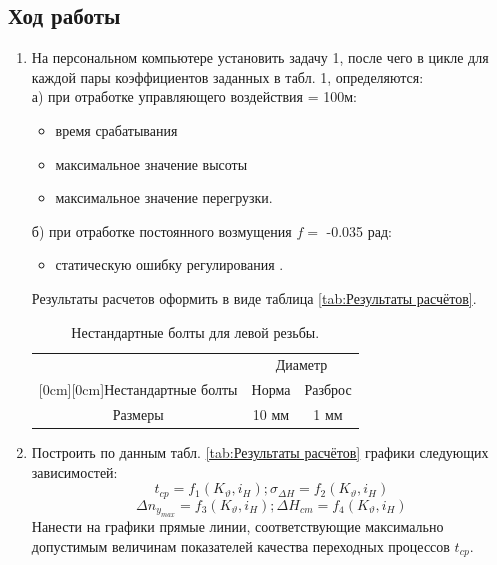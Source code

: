 \documentclass[a4paper,12pt]{article}
\begin{document}
    \subsection{Ход работы}
    
    \begin{enumerate}
    \item На персональном компьютере установить задачу 1, после чего в цикле для
    каждой   пары   коэффициентов  заданных   в  табл.   1,
    определяются:\\
    а)	при отработке управляющего воздействия  = 100м:
        \begin{itemize}
            \item время срабатывания   
            \item максимальное значение высоты  
            \item максимальное значение перегрузки.
        \end{itemize}
    б)	при отработке постоянного возмущения $f=$ -0.035 рад:
        \begin{itemize}
            \item статическую ошибку регулирования .
        \end{itemize}
    
    Результаты расчетов оформить в виде таблица \ref{tab:Результаты расчётов}.

    \begin{table}[H]
        \caption{\label{tab:bolts} Нестандартные болты для левой резьбы.}
            \begin{center}
                \begin{tabular}{|c|c|c|}
                \hline
                & \multicolumn{2}{c|}{Диаметр} \\
                \cline{2-3}
                \raisebox{1.5ex}[0cm][0cm]{Нестандартные болты}
                & Норма & Разброс \\
                \hline
                Размеры & 10 мм & 1 мм \\
                \hline
                \end{tabular}
            \end{center}
        \end{table}

    \item Построить по данным табл. \ref{tab:Результаты расчётов} графики следующих зависимостей:
    $$t_{cp}=f_1(K_{\vartheta},i_H);\sigma_{\Delta H}=f_2(K_{\vartheta},i_H)$$
    $$\Delta n_{y_{max}}=f_3(K_{\vartheta},i_H);\Delta H_{cm}=f_4(K_{\vartheta},i_H)$$
    Нанести   на   графики   прямые   линии,   соответствующие   максимально допустимым величинам показателей качества переходных процессов  $t_{cp}$. 


\end{enumerate}
\end{document}
